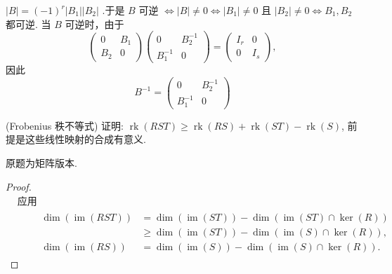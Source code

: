 \begin{solution}
    $|B|=(-1)^r\left|B_1\right|\left|B_2\right|$ .于是
$B$ 可逆 $\Longleftrightarrow|B| \neq 0 \Longleftrightarrow\left|B_1\right| \neq 0$ 且 $\left|B_2\right| \neq 0 \Longleftrightarrow B_1, B_2$ 都可逆.
当 $B$ 可逆时，由于
\[
\left(\begin{array}{cc}
0 & B_1 \\
B_2 & 0
\end{array}\right)\left(\begin{array}{ll}
0 & B_2^{-1} \\
B_1^{-1} & 0
\end{array}\right)=\left(\begin{array}{cc}
I_r & 0 \\
0 & I_s
\end{array}\right),
\]
因此
\[
B^{-1}=\left(\begin{array}{cc}
0 & B_2^{-1} \\
B_1^{-1} & 0
\end{array}\right)
\]
\end{solution}

\begin{problem}
    (Frobenius 秩不等式) 证明: $\operatorname{rk}(R S T) \geq \operatorname{rk}(R S)+\operatorname{rk}(S T)-\operatorname{rk}(S)$, 前提是这些线性映射的合成有意义.
\end{problem}

\begin{remark}
    原题为矩阵版本.
\end{remark}

\begin{proof}
    \[
\begin{aligned}
& \text {应用 } \\
& \qquad \begin{aligned}
\operatorname{dim}(\operatorname{im}(R S T)) & =\operatorname{dim}(\operatorname{im}(S T))-\operatorname{dim}(\operatorname{im}(S T) \cap \operatorname{ker}(R)) \\
& \geq \operatorname{dim}(\operatorname{im}(S T))-\operatorname{dim}(\operatorname{im}(S) \cap \operatorname{ker}(R)), \\
\operatorname{dim}(\operatorname{im}(R S)) & =\operatorname{dim}(\operatorname{im}(S))-\operatorname{dim}(\operatorname{im}(S) \cap \operatorname{ker}(R)) .
\end{aligned}
\end{aligned}
\]
\end{proof}

